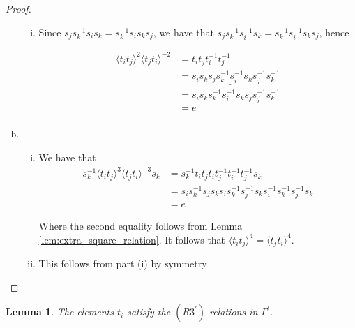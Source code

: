 \documentclass[11pt]{amsart}
\newtheorem{lem}[thm]{Lemma}
\theoremstyle{definition}
\begin{document}
\begin{proof}
\begin{enumerate}[a)]
\begin{enumerate}[i)]
\item Since $s_js_k^{-1}s_is_k = s_k^{-1}s_is_ks_j$, we have that $s_js_k^{-1}s_i^{-1}s_k = s_k^{-1}s_i^{-1}s_ks_j$, hence

\begin{align*}
\langle t_it_j \rangle^{2}\langle t_jt_i \rangle^{-2} &= t_it_jt_i^{-1}t_j^{-1}\\
&= s_is_k\underline{s_js_k^{-1}s_i^{-1}s_k}s_j^{-1}s_k^{-1}\\
&= s_is_ks_k^{-1}s_i^{-1}s_ks_js_j^{-1}s_k^{-1}\\
&= e\\
\end{align*}

\end{enumerate}
\item
\begin{enumerate}[i)]
\item We have that
\begin{align*}
s_k^{-1}\langle t_it_j \rangle^{3}\langle t_jt_i \rangle^{-3}s_k &= s_k^{-1}t_it_jt_it_j^{-1}t_i^{-1}t_j^{-1}s_k\\
&= s_is_k^{-1}s_js_ks_is_k^{-1}s_j^{-1}s_ks_i^{-1}s_k^{-1}s_j^{-1}s_k\\
&= e
\end{align*}

Where the second equality follows from Lemma \ref{lem:extra_square_relation}.  It follows that $\langle t_it_j \rangle^{4} = \langle t_jt_i \rangle^{4}$.

\item This follows from part (i) by symmetry
\end{enumerate}
\end{enumerate}
\end{proof}



\begin{lem}\label{lem:r3_relations}
The elements $t_i$ satisfy the $(R3^\prime)$ relations in $\Gamma^\prime$.
\end{lem}
\end{document}

